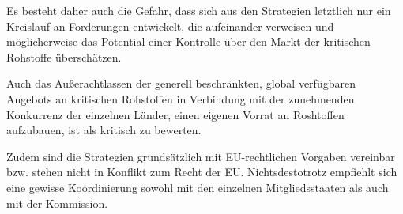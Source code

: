 \documentclass[12pt,a4paper,oneside]{book} %
\begin{document}
Es besteht daher auch die Gefahr, dass sich aus den Strategien letztlich nur ein Kreislauf an Forderungen entwickelt, die aufeinander verweisen und möglicherweise das Potential einer Kontrolle über den Markt der kritischen Rohstoffe überschätzen.

Auch das Außerachtlassen der generell beschränkten, global verfügbaren Angebots an kritischen Rohstoffen in Verbindung mit der zunehmenden Konkurrenz der einzelnen Länder, einen eigenen Vorrat an Roshtoffen aufzubauen, ist als kritisch zu bewerten.

Zudem sind die Strategien grundsätzlich mit EU-rechtlichen Vorgaben vereinbar bzw. stehen nicht in Konflikt zum Recht der EU. Nichtsdestotrotz empfiehlt sich eine gewisse Koordinierung sowohl mit den einzelnen Mitgliedsstaaten als auch mit der Kommission.
\end{document}
